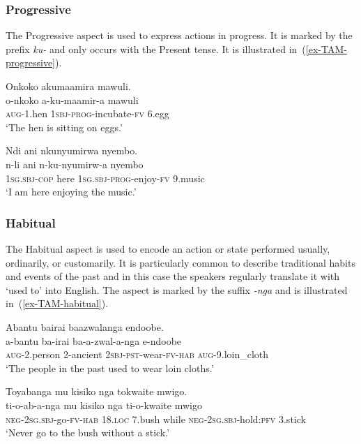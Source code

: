 \subsubsection{Progressive} \label{sec-aspect-progressive}

The Progressive aspect is used to express actions in progress.
It is marked by the prefix \textit{ku-} and only occurs with the Present tense. 
It is illustrated in~(\ref{ex-TAM-progressive}). 

\ea \label{ex-TAM-progressive}
\begin{xlist}
\ex	
	\glll Onkoko akumaamira mawuli.\\
	o-nkoko a-ku-maamir-a mawuli\\
		\textsc{aug}-1.hen \textsc{1sbj}-\textsc{prog}-incubate-\textsc{fv} 6.egg\\
\glt  ‘The hen is sitting on eggs.’

\ex 		\glll Ndi ani nkunyumirwa nyembo.\\
	n-li ani n-ku-nyumirw-a nyembo\\
		\textsc{1sg.sbj}-\textsc{cop} here \textsc{1sg.sbj}-\textsc{prog}-enjoy-\textsc{fv} 9.music\\
\glt ‘I am here enjoying the music.'

\end{xlist}
\z
 
\subsubsection{Habitual} \label{sec-aspect-habitual}
The Habitual aspect is used to encode an action or state performed usually, ordinarily, or customarily. 
It is particularly common to describe traditional habits and events of the past and in this case the speakers regularly translate it with `used to' into English.
The aspect is marked by the suffix \textit{-nga} and is illustrated in~(\ref{ex-TAM-habitual}). 

\ea \label{ex-TAM-habitual}
\begin{xlist}

\ex 		\glll Abantu bairai baazwalanga endoobe.\\
	a-bantu ba-irai ba-a-zwal-a-nga e-ndoobe\\
	\textsc{aug}-2.person 2-ancient  \textsc{2sbj}-\textsc{pst}-wear-\textsc{fv}-\textsc{hab} \textsc{aug}-9.loin\_cloth\\
\glt ‘The people in the past used to wear loin cloths.'

\ex 		\glll Toyabanga mu kisiko nga tokwaite mwigo.\\
	ti-o-ab-a-nga mu kisiko nga ti-o-kwaite mwigo\\
	\textsc{neg}-2\textsc{sg.sbj}-go-\textsc{fv}-\textsc{hab} 18.\textsc{loc} 7.bush	while \textsc{neg}-2\textsc{sg.sbj}-hold:\textsc{pfv} 3.stick\\
\glt ‘Never go to the bush without a stick.'
\end{xlist}
\z
 
